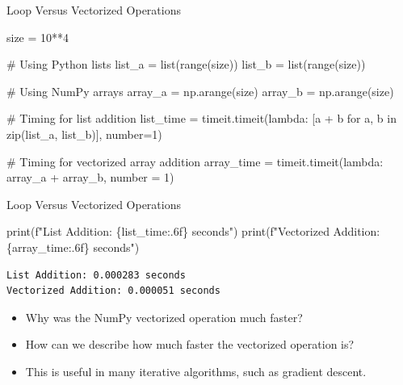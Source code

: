 \documentclass[
  ignorenonframetext,
]{beamer}
\newenvironment{Shaded}{\begin{snugshade}}{\end{snugshade}}
\newcommand{\BuiltInTok}[1]{\textcolor[rgb]{0.00,0.23,0.31}{#1}}
\newcommand{\CommentTok}[1]{\textcolor[rgb]{0.37,0.37,0.37}{#1}}
\newcommand{\ControlFlowTok}[1]{\textcolor[rgb]{0.00,0.23,0.31}{#1}}
\newcommand{\DecValTok}[1]{\textcolor[rgb]{0.68,0.00,0.00}{#1}}
\newcommand{\KeywordTok}[1]{\textcolor[rgb]{0.00,0.23,0.31}{#1}}
\newcommand{\NormalTok}[1]{\textcolor[rgb]{0.00,0.23,0.31}{#1}}
\newcommand{\OperatorTok}[1]{\textcolor[rgb]{0.37,0.37,0.37}{#1}}
\newcommand{\SpecialCharTok}[1]{\textcolor[rgb]{0.37,0.37,0.37}{#1}}
\newcommand{\SpecialStringTok}[1]{\textcolor[rgb]{0.13,0.47,0.30}{#1}}
\begin{document}
\begin{frame}[fragile]{Loop Versus Vectorized Operations}
\protect\hypertarget{loop-versus-vectorized-operations}{}
\begin{Shaded}
\begin{Highlighting}[]
\NormalTok{size }\OperatorTok{=} \DecValTok{10}\OperatorTok{**}\DecValTok{4}

\CommentTok{\# Using Python lists}
\NormalTok{list\_a }\OperatorTok{=} \BuiltInTok{list}\NormalTok{(}\BuiltInTok{range}\NormalTok{(size))}
\NormalTok{list\_b }\OperatorTok{=} \BuiltInTok{list}\NormalTok{(}\BuiltInTok{range}\NormalTok{(size))}

\CommentTok{\# Using NumPy arrays}
\NormalTok{array\_a }\OperatorTok{=}\NormalTok{ np.arange(size)}
\NormalTok{array\_b }\OperatorTok{=}\NormalTok{ np.arange(size)}

\CommentTok{\# Timing for list addition}
\NormalTok{list\_time }\OperatorTok{=}\NormalTok{ timeit.timeit(}\KeywordTok{lambda}\NormalTok{: }
\NormalTok{  [a }\OperatorTok{+}\NormalTok{ b }\ControlFlowTok{for}\NormalTok{ a, b }\KeywordTok{in} \BuiltInTok{zip}\NormalTok{(list\_a, list\_b)], number}\OperatorTok{=}\DecValTok{1}\NormalTok{)}

\CommentTok{\# Timing for vectorized array addition}
\NormalTok{array\_time }\OperatorTok{=}\NormalTok{ timeit.timeit(}\KeywordTok{lambda}\NormalTok{: }
\NormalTok{  array\_a }\OperatorTok{+}\NormalTok{ array\_b, number }\OperatorTok{=} \DecValTok{1}\NormalTok{)}
\end{Highlighting}
\end{Shaded}
\end{frame}

\begin{frame}[fragile]{Loop Versus Vectorized Operations}
\protect\hypertarget{loop-versus-vectorized-operations-1}{}
\begin{Shaded}
\begin{Highlighting}[]
\BuiltInTok{print}\NormalTok{(}\SpecialStringTok{f"List Addition: }\SpecialCharTok{\{}\NormalTok{list\_time}\SpecialCharTok{:.6f\}}\SpecialStringTok{ seconds"}\NormalTok{)}
\BuiltInTok{print}\NormalTok{(}\SpecialStringTok{f"Vectorized Addition: }\SpecialCharTok{\{}\NormalTok{array\_time}\SpecialCharTok{:.6f\}}\SpecialStringTok{ seconds"}\NormalTok{)}
\end{Highlighting}
\end{Shaded}

\begin{verbatim}
List Addition: 0.000283 seconds
Vectorized Addition: 0.000051 seconds
\end{verbatim}

\begin{itemize}
\item
  Why was the NumPy vectorized operation much faster?
\item
  How can we describe how much faster the vectorized operation is?
\item
  This is useful in many iterative algorithms, such as gradient descent.
\end{itemize}
\end{frame}
\end{document}

